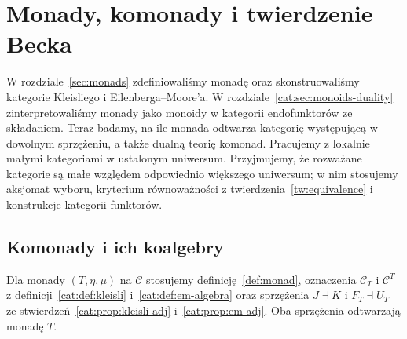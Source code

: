 \section{Monady, komonady i twierdzenie Becka}\label{cat:sec:monadicity}
W rozdziale~\ref{sec:monads} zdefiniowaliśmy monadę oraz skonstruowaliśmy kategorie Kleisliego i Eilenberga--Moore'a. W rozdziale~\ref{cat:sec:monoids-duality} zinterpretowaliśmy monady jako monoidy w kategorii endofunktorów ze składaniem. Teraz badamy, na ile monada odtwarza kategorię występującą w dowolnym sprzężeniu, a także dualną teorię komonad. Pracujemy z lokalnie małymi kategoriami w ustalonym uniwersum. Przyjmujemy, że rozważane kategorie są małe względem odpowiednio większego uniwersum; w nim stosujemy aksjomat wyboru, kryterium równoważności z twierdzenia~\ref{tw:equivalence} i konstrukcje kategorii funktorów.

\subsection{Komonady i ich koalgebry}
Dla monady $(T,\eta,\mu)$ na $\mathcal C$ stosujemy definicję~\ref{def:monad}, oznaczenia $\mathcal C_T$ i $\mathcal C^T$ z definicji~\ref{cat:def:kleisli} i~\ref{cat:def:em-algebra} oraz sprzężenia $J\dashv K$ i $F_T\dashv U_T$ ze stwierdzeń~\ref{cat:prop:kleisli-adj} i~\ref{cat:prop:em-adj}. Oba sprzężenia odtwarzają monadę $T$.

